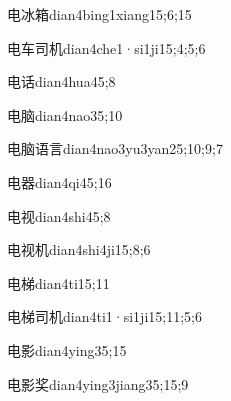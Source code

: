 \begin{verbete}{电冰箱}{dian4bing1xiang1}{5;6;15}
\end{verbete}

\begin{verbete}{电车司机}{dian4che1·si1ji1}{5;4;5;6}
\end{verbete}

\begin{verbete}{电话}{dian4hua4}{5;8}
\end{verbete}

\begin{verbete}{电脑}{dian4nao3}{5;10}
\end{verbete}

\begin{verbete}{电脑语言}{dian4nao3yu3yan2}{5;10;9;7}
\end{verbete}

\begin{verbete}{电器}{dian4qi4}{5;16}
\end{verbete}

\begin{verbete}{电视}{dian4shi4}{5;8}
\end{verbete}

\begin{verbete}{电视机}{dian4shi4ji1}{5;8;6}
\end{verbete}

\begin{verbete}{电梯}{dian4ti1}{5;11}
\end{verbete}

\begin{verbete}{电梯司机}{dian4ti1·si1ji1}{5;11;5;6}
\end{verbete}

\begin{verbete}{电影}{dian4ying3}{5;15}
\end{verbete}

\begin{verbete}{电影奖}{dian4ying3jiang3}{5;15;9}
\end{verbete}

